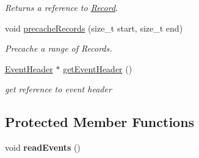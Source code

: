 \begin{DoxyCompactItemize}
\begin{DoxyCompactList}\small\item\em Returns a reference to \hyperlink{classgdf_1_1_record}{Record}. \item\end{DoxyCompactList}\item 
\hypertarget{classgdf_1_1_reader_ae54fe50c79b21ec12bdc314164ccbc21}{
void \hyperlink{classgdf_1_1_reader_ae54fe50c79b21ec12bdc314164ccbc21}{precacheRecords} (size\_\-t start, size\_\-t end)}
\label{classgdf_1_1_reader_ae54fe50c79b21ec12bdc314164ccbc21}

\begin{DoxyCompactList}\small\item\em Precache a range of Records. \item\end{DoxyCompactList}\item 
\hypertarget{classgdf_1_1_reader_af10117d1c54e0aaa860e7f158cc7db15}{
\hyperlink{classgdf_1_1_event_header}{EventHeader} $\ast$ \hyperlink{classgdf_1_1_reader_af10117d1c54e0aaa860e7f158cc7db15}{getEventHeader} ()}
\label{classgdf_1_1_reader_af10117d1c54e0aaa860e7f158cc7db15}

\begin{DoxyCompactList}\small\item\em get reference to event header \item\end{DoxyCompactList}\end{DoxyCompactItemize}
\subsection*{Protected Member Functions}
\begin{DoxyCompactItemize}
\item 
\hypertarget{classgdf_1_1_reader_a300e99e98eb147c660edddf109a40116}{
void {\bfseries readEvents} ()}
\label{classgdf_1_1_reader_a300e99e98eb147c660edddf109a40116}

\end{DoxyCompactItemize}
